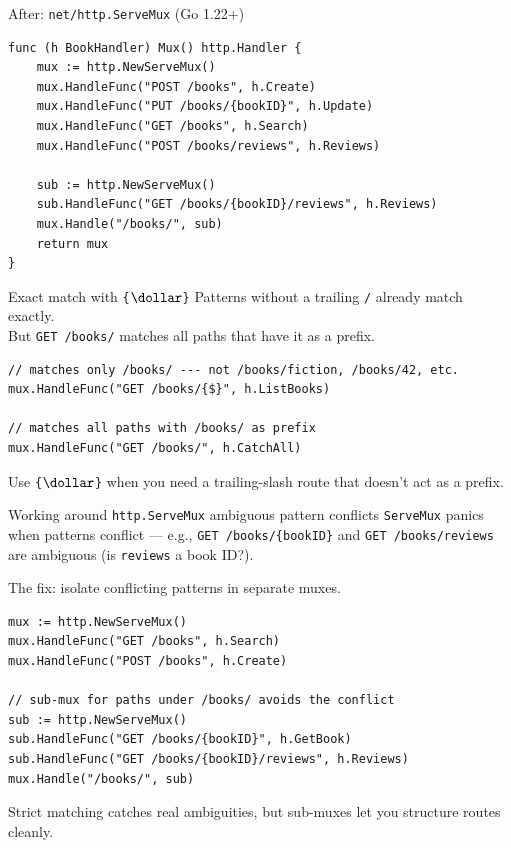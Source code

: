 \documentclass[aspectratio=169,11pt]{beamer}
\begin{document}
\begin{frame}[fragile]{After: \texttt{net/http.ServeMux} (Go 1.22+)}
\begin{lstlisting}
func (h BookHandler) Mux() http.Handler {
	mux := http.NewServeMux()
	mux.HandleFunc("POST /books", h.Create)
	mux.HandleFunc("PUT /books/{bookID}", h.Update)
	mux.HandleFunc("GET /books", h.Search)
	mux.HandleFunc("POST /books/reviews", h.Reviews)

	sub := http.NewServeMux()
	sub.HandleFunc("GET /books/{bookID}/reviews", h.Reviews)
	mux.Handle("/books/", sub)
	return mux
}
\end{lstlisting}
\end{frame}

\begin{frame}[fragile]{Exact match with \texttt{\{$\dollar$\}}}
  Patterns without a trailing \texttt{/} already match exactly.\\
  But \texttt{GET /books/} matches all paths that have it as a prefix.

  \vspace{6pt}
\begin{lstlisting}
// matches only /books/ --- not /books/fiction, /books/42, etc.
mux.HandleFunc("GET /books/{$}", h.ListBooks)

// matches all paths with /books/ as prefix
mux.HandleFunc("GET /books/", h.CatchAll)
\end{lstlisting}

  \vspace{4pt}
  {\small Use \texttt{\{$\dollar$\}} when you need a trailing-slash route that doesn't act as a prefix.}
\end{frame}

\begin{frame}[fragile]{Working around \texttt{http.ServeMux} ambiguous pattern conflicts}
  \texttt{ServeMux} panics when patterns conflict --- e.g., \texttt{GET /books/\{bookID\}}
  and \texttt{GET /books/reviews} are ambiguous (is \texttt{reviews} a book ID?).

  \vspace{6pt}
  The fix: isolate conflicting patterns in separate muxes.

  \vspace{4pt}
\begin{lstlisting}
mux := http.NewServeMux()
mux.HandleFunc("GET /books", h.Search)
mux.HandleFunc("POST /books", h.Create)

// sub-mux for paths under /books/ avoids the conflict
sub := http.NewServeMux()
sub.HandleFunc("GET /books/{bookID}", h.GetBook)
sub.HandleFunc("GET /books/{bookID}/reviews", h.Reviews)
mux.Handle("/books/", sub)
\end{lstlisting}

  \vspace{4pt}
  {\small Strict matching catches real ambiguities, but sub-muxes let you structure routes cleanly.}
\end{frame}
\end{document}

